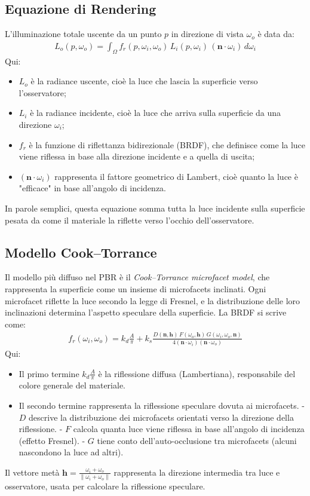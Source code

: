 \documentclass[12pt,a4paper,openright,twoside]{book}
\begin{document}
\subsection*{Equazione di Rendering}
L'illuminazione totale uscente da un punto $p$ in direzione di vista $\omega_o$ è data da:
\begin{align*}
L_o(p,\omega_o) = \int_{\Omega} f_r(p,\omega_i,\omega_o) \, L_i(p,\omega_i)\, (\mathbf{n}\cdot\omega_i)\,d\omega_i
\end{align*}
\noindent
Qui:
\begin{itemize}
    \item $L_o$ è la radiance uscente, cioè la luce che lascia la superficie verso l'osservatore;
    \item $L_i$ è la radiance incidente, cioè la luce che arriva sulla superficie da una direzione $\omega_i$;
    \item $f_r$ è la funzione di riflettanza bidirezionale (BRDF), che definisce come la luce viene riflessa in base alla direzione incidente e a quella di uscita;
    \item $(\mathbf{n}\cdot\omega_i)$ rappresenta il fattore geometrico di Lambert, cioè quanto la luce è "efficace" in base all'angolo di incidenza.
\end{itemize}
In parole semplici, questa equazione somma tutta la luce incidente sulla superficie pesata da come il materiale
la riflette verso l'occhio dell'osservatore.

\subsection*{Modello Cook–Torrance}
Il modello più diffuso nel PBR è il \emph{Cook–Torrance microfacet model}, che rappresenta la superficie come un insieme
di microfacets inclinati. Ogni microfacet riflette la luce secondo la legge di Fresnel, e la distribuzione delle
loro inclinazioni determina l'aspetto speculare della superficie.
La BRDF si scrive come:
\begin{align*}
f_r(\omega_i,\omega_o) = k_d \frac{A}{\pi} +
k_s \frac{D(\mathbf{n},\mathbf{h})\,F(\omega_o,\mathbf{h})\,G(\omega_i,\omega_o,\mathbf{n})}
{4(\mathbf{n}\cdot\omega_i)(\mathbf{n}\cdot\omega_o)}
\end{align*}
\noindent
Qui:
\begin{itemize}
    \item Il primo termine $k_d \frac{A}{\pi}$ è la riflessione diffusa (Lambertiana), responsabile del colore generale del materiale.
    \item Il secondo termine rappresenta la riflessione speculare dovuta ai microfacets.
      - $D$ descrive la distribuzione dei microfacets orientati verso la direzione della riflessione.
      - $F$ calcola quanta luce viene riflessa in base all'angolo di incidenza (effetto Fresnel).
      - $G$ tiene conto dell'auto-occlusione tra microfacets (alcuni nascondono la luce ad altri).
\end{itemize}
Il vettore metà $\mathbf{h} = \frac{\omega_i+\omega_o}{\|\omega_i+\omega_o\|}$ rappresenta la direzione intermedia
tra luce e osservatore, usata per calcolare la riflessione speculare.
\end{document}

